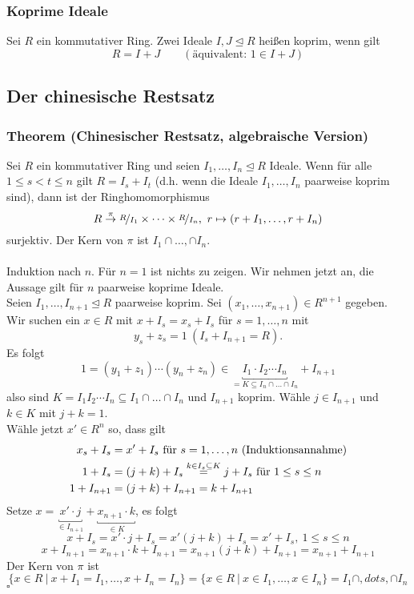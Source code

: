 \subsubsection*{Koprime Ideale}
Sei $R$ ein kommutativer Ring.
Zwei Ideale $I,J\trianglelefteq R$ heißen koprim, wenn gilt
\[
R=I+J \qquad(\text{äquivalent: } 1\in I+J)
\]

\subsection{Der chinesische Restsatz}
\label{sub:restsatz}
\subsubsection*{Theorem (Chinesischer Restsatz, algebraische Version)}
Sei $R$ ein kommutativer Ring und seien $I_1,\dots,I_n\trianglelefteq R$ Ideale.
Wenn für alle $1\le s<t\le n$ gilt $R=I_s+I_t$ (d.h. wenn die Ideale $I_1,\dots,I_n$ paarweise koprim sind), dann ist der Ringhomomorphismus
\[
R\stackrel{\pi}{\to}\nicefrac{R}{I_1}\times\dots\times \nicefrac{R}{I_n},~r\mapsto (r+I_1,\dots,r+I_n)
\]
surjektiv.
Der Kern von $\pi$ ist $I_1\cap\dots,\cap I_n$.\\

\\
Induktion nach $n$.
Für $n=1$ ist nichts zu zeigen.
Wir nehmen jetzt an, die Aussage gilt für $n$ paarweise koprime Ideale.\\
Seien $I_1,\dots,I_{n+1}\trianglelefteq R$ paarweise koprim.
Sei $(x_1,\dots,x_{n+1})\in R^{n+1}$ gegeben.
Wir suchen ein $x\in R$ mit $x+I_s=x_s+I_s$ für $s=1,\dots,n$ mit
\[
y_s+z_s=1~(I_s+I_{n+1}=R).
\]
Es folgt
\[
1=(y_1+z_1)\cdots(y_n+z_n)\in \underbracket{I_1\cdot I_2\cdots I_n}_{=K\subseteq I_n\cap\dots\cap I_n}+I_{n+1}
\]
also sind $K=I_1I_2\cdots I_n\subseteq I_1\cap\dots\cap I_n$ und $I_{n+1}$ koprim.
Wähle $j\in I_{n+1}$ und $k\in K$ mit $j+k=1$.\\
Wähle jetzt $x'\in R^n$ so, dass gilt
\begin{equation*}
\begin{aligned}
	x_s+I_s &= x'+I_s\text{ für }s=1,\dots,n~(\text{Induktionsannahme})\\
	1+I_s &= (j+k)+I_s \stackrel{k\in I_s\subseteq K}{=} j+I_s \text{ für }1\le s \le n\\
	1+I_{n+1} &= (j+k)+I_{n+1} = k+I_{n+1}
\end{aligned}
\end{equation*}
Setze $x=\underbracket{x'\cdot j}_{\in I_{n+1}}+\underbracket{x_{n+1}\cdot k}_{\in K}$, es folgt
\[
x+I_s=x'\cdot j+I_s=x'(j+k)+I_s=x'+I_s,~1\le s\le n
\]
\[
x+I_{n+1}=x_{n+1}\cdot k+I_{n+1}=x_{n+1}(j+k)+I_{n+1}=x_{n+1}+I_{n+1}
\]
Der Kern von $\pi$ ist 
\[
\{x\in R~|~x+I_1=I_1,\dots, x+I_n=I_n \}=\{x\in R~|~x\in I_1,\dots,x\in I_n \}=I_1\cap,dots,\cap I_n
\]
\hfill $\square$

